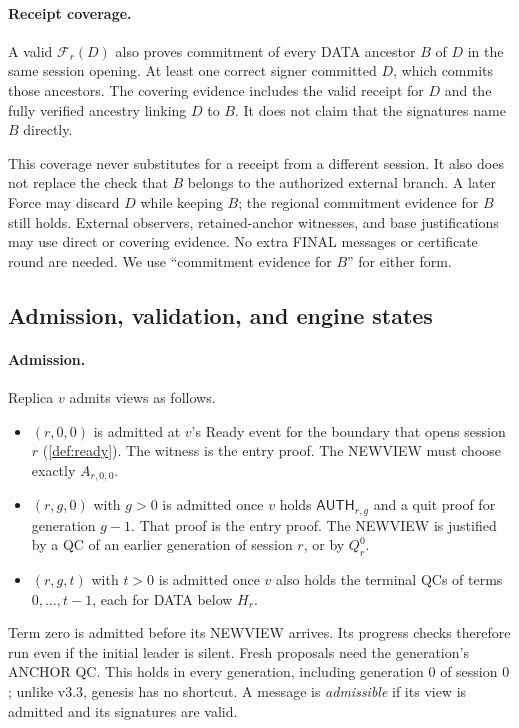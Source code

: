 \documentclass[11pt,a4paper]{article}
\newcommand{\FC}{\mathcal F}
\newcommand{\tagg}[1]{\ensuremath{\mathsf{#1}}}
\begin{document}
\paragraph{Receipt coverage.}
\label{sec:coverage}
A valid $\FC_r(D)$ also proves commitment of every DATA ancestor $B$
of $D$ in the same session opening. At least one correct signer committed
$D$, which commits those ancestors. The covering evidence includes the
valid receipt for $D$ and the fully verified ancestry linking $D$ to $B$.
It does not claim that the signatures name $B$ directly.

This coverage never substitutes for a receipt from a different session.
It also does not replace the check that $B$ belongs to the authorized
external branch. A later Force may discard $D$ while keeping $B$; the
regional commitment evidence for $B$ still holds. External observers,
retained-anchor witnesses, and base justifications may use direct or
covering evidence. No extra FINAL messages or certificate round are
needed. We use ``commitment evidence for $B$'' for either form.

\subsection{Admission, validation, and engine states}
\label{sec:admission}
\paragraph{Admission.}
Replica $v$ admits views as follows.
\begin{itemize}
\item $(r,0,0)$ is admitted at $v$'s Ready event for the boundary that
opens session $r$ (\cref{def:ready}). The witness is the entry proof.
The NEWVIEW must choose exactly $A_{r,0,0}$.
\item $(r,g,0)$ with $g>0$ is admitted once $v$ holds
$\tagg{AUTH}_{r,g}$ and a quit proof for generation $g-1$. That proof is
the entry proof. The NEWVIEW is justified by a QC of an earlier
generation of session $r$, or by $Q_r^0$.
\item $(r,g,t)$ with $t>0$ is admitted once $v$ also holds the terminal
QCs of terms $0,\ldots,t-1$, each for DATA below $H_r$.
\end{itemize}
Term zero is admitted before its NEWVIEW arrives. Its progress checks
therefore run even if the initial leader is silent. Fresh proposals need
the generation's ANCHOR QC. This holds in every generation, including
generation $0$ of session $0$; unlike v3.3, genesis has no shortcut. A
message is \emph{admissible} if its view is admitted and its signatures
are valid.
\end{document}
